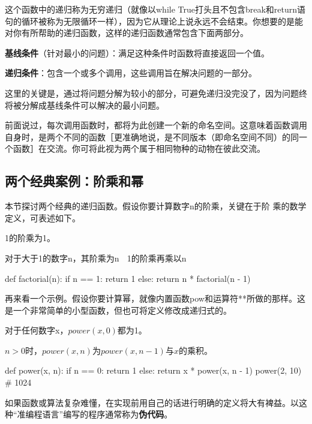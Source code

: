 这个函数中的递归称为无穷递归（就像以while True打头且不包含break和return语句的循环被称为无限循环一样），因为它从理论上说永远不会结束。你想要的是能对你有所帮助的递归函数，这样的递归函数通常包含下面两部分。
\begin{dinglist}{43}
    \item \textbf{基线条件}（针对最小的问题）：满足这种条件时函数将直接返回一个值。
    \item \textbf{递归条件}：包含一个或多个调用，这些调用旨在解决问题的一部分。
\end{dinglist}

这里的关键是，通过将问题分解为较小的部分，可避免递归没完没了，因为问题终将被分解成基线条件可以解决的最小问题。

前面说过，每次调用函数时，都将为此创建一个新的命名空间。这意味着函数调用自身时，是两个不同的函数［更准确地说，是不同版本（即命名空间不同）的同一个函数］在交流。你可将此视为两个属于相同物种的动物在彼此交流。

\subsection{两个经典案例：阶乘和幂}
本节探讨两个经典的递归函数。假设你要计算数字n的阶乘，关键在于阶
乘的数学定义，可表述如下。
\begin{dinglist}{43}
    \item 1的阶乘为1。
    \item 对于大于1的数字n，其阶乘为n  1的阶乘再乘以n
\end{dinglist}
\begin{pyc}
def factorial(n):
    if n == 1:
        return 1
    else:
        return n * factorial(n - 1)
\end{pyc}

再来看一个示例。假设你要计算幂，就像内置函数pow和运算符**所做的那样。这是一个非常简单的小型函数，但也可将定义修改成递归式的。
\begin{dinglist}{43}
    \item 对于任何数字x，$power(x, 0)$都为1。
    \item $n>0$时，$power(x, n)$为$power(x, n-1)$与$x$的乘积。
\end{dinglist}
\begin{pyc}
def power(x, n):
    if n == 0:
        return 1
    else:
        return x * power(x, n - 1)
power(2, 10)  # 1024
\end{pyc}

\begin{tcolorbox}
    如果函数或算法复杂难懂，在实现前用自己的话进行明确的定义将大有裨益。以这种``准编程语言”编写的程序通常称为\textbf{伪代码}。
\end{tcolorbox}

